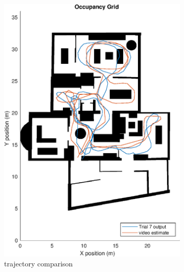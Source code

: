 \begin{figure}[H]
	\centering
	\begin{subfigure}[t]{.45\textwidth}
		\centering
		\includegraphics[width=0.9\linewidth]{images/20201118_1908_trial7_output_2}
		\caption{trajectory comparison}
		\label{fig:shspf_trial7_on_map}
	\end{subfigure}
	\begin{subfigure}[t]{.45\textwidth}
		\centering

\end{subfigure}
\end{figure}
